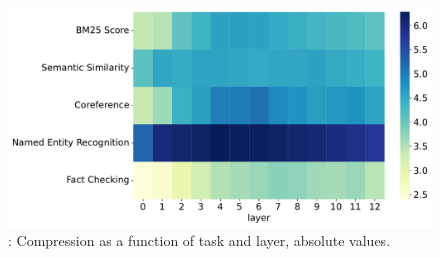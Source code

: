 \begin{figure}
    \centering
    \includegraphics[width=\textwidth]{gfx/probing/abs_heatmap_compression_base}
    \caption{: Compression as a function of task and layer, absolute values.}
\end{figure}

